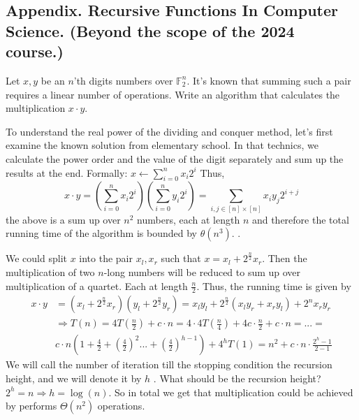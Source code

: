 \subsection{Appendix. Recursive Functions In Computer Science. (Beyond the scope of the 2024 course.)}




\begin{example}
Let \(x,y\) be an \(n\)'th digits numbers over \( \mathbb{F}^{n}_{2} \). It's known that summing such a pair requires a linear number of operations. Write an algorithm that calculates the multiplication \(x\cdot y\). 
\end{example}
\begin{example}
To understand the real power of the dividing and conquer method, let's first examine the known solution from elementary school.  In that technics, we calculate the power order and the value of the digit separately and sum up the results at the end. Formally: \(x \leftarrow \sum_{i=0}^{n}{x_{i}2^{i}}\) Thus, \[ x\cdot y =\left( \sum_{i=0}^{n}{x_{i}2^{i}} \right) \left( \sum_{i=0}^{n}{y_{i}2^{i}} \right) =  \sum_{i,j \in [n]\times[n] }{ x_{i}y_{j}2^{i+j} }\] the above is a sum up over \(n^2\) numbers, each at length \(n\) and therefore the total running time of the algorithm is bounded by \( \theta(n^3) \). .
\end{example}
\begin{example} We could split \(x\) into the pair \(x_{l}, x_{r}\) such that \(x = x_{l} + 2^{\frac{n}{2}}x_{r} \). Then the multiplication of two \(n\)-long numbers will be reduced to sum up over multiplication of a quartet. Each at length \(\frac{n}{2}\). Thus, the running time is given by \begin{equation*}
    \begin{split}
 x\cdot y & = \left(x_{l} + 2^{\frac{n}{2}}x_{r}\right)\left(y_{l} + 2^{\frac{n}{2}}y_{r}\right) = x_{l}y_{l} + 2^{\frac{n}{2}} \left( x_{l}y_{r} + x_{r}y_{l} \right) + 2^{n}x_{r}y_{r} \\ &  \Rightarrow T\left(n\right)  =4T\left(\frac{n}{2}\right)+c\cdot n=4\cdot4T\left(\frac{n}{4}\right)+4c\cdot\frac{n}{2}+c\cdot n = ... = \\ & c\cdot n\left(1+\frac{4}{2}+\left(\frac{4}{2}\right)^{2}...+\left(\frac{4}{2}\right)^{h-1}\right) + 4^{h}T(1) = n^{2} + c\cdot n\cdot\frac{2^{h}-1}{2-1}
    \end{split}
\end{equation*}
We will call the number of iteration till the stopping condition the recursion height, and we will denote it by \(h\) . What should be the recursion height? \( 2^{h} = n \Rightarrow h =\log\left(n\right) \). So in total we get that multiplication could be achieved by performs \( \Theta\left(n^2\right)\) operations. 
\end{example}
